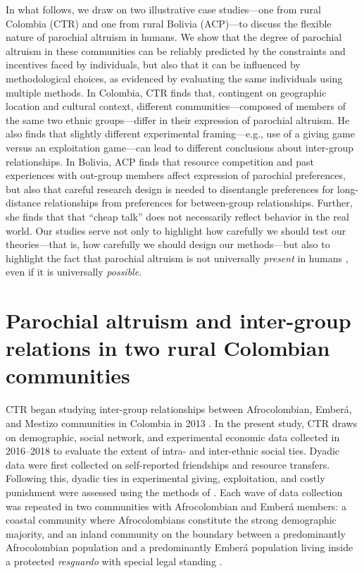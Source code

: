 \documentclass[bibauthoryear]{aa}
\begin{document}
In what follows, we draw on two illustrative case studies---one from rural Colombia (CTR) and one from rural Bolivia (ACP)---to discuss the flexible nature of parochial altruism in humans. We show that the degree of parochial altruism in these communities can be reliably predicted by the constraints and incentives faced by individuals, but also that it can be influenced by methodological choices, as evidenced by evaluating the same individuals using multiple methods. In Colombia, CTR finds that, contingent on  geographic location and cultural context, different communities---composed of members of the same two ethnic groups---differ in their expression of parochial altruism. He also finds that slightly different experimental framing---e.g., use of a giving game versus an exploitation game---can lead to different conclusions about inter-group relationships. In Bolivia, ACP finds that resource competition and past experiences with out-group members affect expression of parochial preferences, but also that careful research design is needed to disentangle preferences for long-distance relationships from preferences for between-group relationships. Further, she finds that that ``cheap talk'' does not necessarily reflect behavior in the real world. Our studies serve not only to highlight how carefully we should test our theories---that is, how carefully we should design our methods---but also to highlight the fact that parochial altruism is not universally \textit{present} in humans \citep[e.g.,][] {brewer1976ethnocentrism}, even if it is universally \textit{possible}.

\section{Parochial altruism and inter-group relations in two rural Colombian communities}
CTR began studying inter-group relationships between  Afrocolombian, Ember\'a, and  Mestizo communities in Colombia in 2013 \citep{ross2015frequency}. In the present study, CTR draws on demographic, social network, and experimental economic data collected in 2016--2018 to evaluate the extent of intra- and inter-ethnic social ties. Dyadic data were first collected on self-reported friendships and resource transfers. Following this, dyadic ties in experimental giving, exploitation, and costly punishment were assessed using the methods of \citet{gervais2017rich}. Each wave of data collection was repeated in two communities with Afrocolombian and Ember\'a members: a coastal community where Afrocolombians constitute the strong demographic majority, and an inland community \citep[previously studied by][]{Cay73} on the boundary between a predominantly Afrocolombian population and a predominantly Ember\'a population living inside  a protected \emph{resguardo} with special legal standing \citep{MORAVERA2016}.
\end{document}
